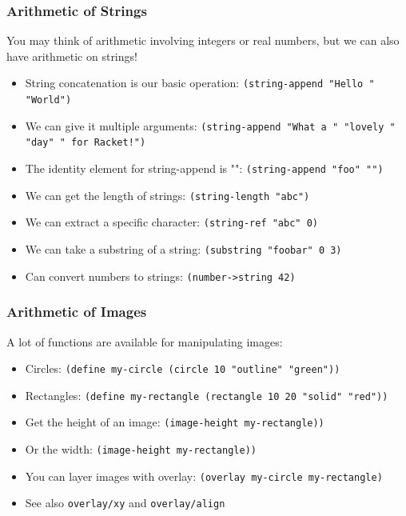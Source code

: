 \documentclass{beamer}
\begin{document}
\begin{frame}
  \frametitle{Arithmetic of Strings}
  You may think of arithmetic involving integers or real numbers, but
  we can also have arithmetic on strings!
  \begin{itemize}
  \item<2-> String concatenation is our basic operation: \texttt{(string-append "Hello " "World")}
  \item<3-> We can give it multiple arguments: \texttt{(string-append "What a " "lovely " "day" " for Racket!")}
  \item<4-> The identity element for string-append is "":
    \texttt{(string-append "foo" "")}
  \item<5-> We can get the length of strings: \texttt{(string-length "abc")}
  \item<6-> We can extract a specific character: \texttt{(string-ref "abc" 0)}
  \item<7-> We can take a substring of a string: \texttt{(substring "foobar" 0 3)}
  \item<8-> Can convert numbers to strings: \texttt{(number->string 42)}
  \end{itemize}
\end{frame}

\begin{frame}
  \frametitle{Arithmetic of Images}
  A lot of functions are available for manipulating images:
  \begin{itemize}
  \item<2-> Circles: \texttt{(define my-circle (circle 10 "outline" "green"))}
  \item<3-> Rectangles: \texttt{(define my-rectangle (rectangle 10 20 "solid" "red"))}
  \item<4-> Get the height of an image: \texttt{(image-height my-rectangle))}
  \item<5-> Or the width: \texttt{(image-height my-rectangle))}
  \item<6-> You can layer images with overlay: \texttt{(overlay my-circle my-rectangle)}
  \item<7-> See also \texttt{overlay/xy} and \texttt{overlay/align}
  \end{itemize}
\end{frame}
\end{document}
